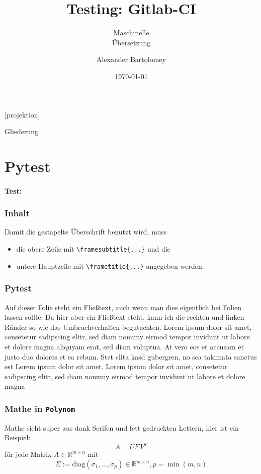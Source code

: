 \documentclass[t]{beamer}
\title{Testing: Gitlab-CI}
\subtitle{Maschinelle\\Übersetzung}
\date[Polynom]{\today}
\author{Alexander Bartolomey}
\institute[Polynom]{Polynom Aachen University}
\begin{document}
[projektion]{}

\begin{frame}[plain]
  \titlepage{}
\end{frame}

\begin{frame}{Gliederung}
  \tableofcontents[currentsubsubsection]
\end{frame}

\section{Pytest}

\begin{frame}
  \framesubtitle{Test:}
  \frametitle{Inhalt}
  Damit die gestapelte Überschrift benutzt wird, muss \begin{itemize}
    \item die obere Zeile mit \texttt{\textbackslash{}framesubtitle\{...\}} und die
    \item untere Hauptzeile mit \texttt{\textbackslash{}frametitle\{...\}} angegeben werden.
  \end{itemize} 
\end{frame}

\begin{frame}
  \frametitle{Pytest}
  Auf dieser Folie steht ein Fließtext, auch wenn man dies eigentlich
  bei Folien lassen sollte.  Da hier aber ein Fließtext steht, kann
  ich die rechten und linken Ränder so wie das Umbruchverhalten begutachten. 
  Lorem ipsum dolor sit amet, consetetur sadipscing elitr, sed diam nonumy eirmod 
  tempor invidunt ut labore et dolore magna aliquyam erat, sed diam voluptua. 
  At vero eos et accusam et justo duo dolores et ea rebum. Stet clita kasd gubergren, 
  no sea takimata sanctus est Lorem ipsum dolor sit amet. Lorem ipsum dolor sit amet, 
  consetetur sadipscing elitr, sed diam nonumy eirmod tempor invidunt ut labore 
  et dolore magna
\end{frame}

\begin{frame}
  \frametitle{Mathe in \texttt{Polynom}}
  Mathe sieht super aus dank Serifen und fett gedruckten Lettern, hier ist ein Beispiel:
  \[A = U\Sigma V^T\]
  für jede Matrix \(A \in \mathbb{R}^{m\times n}\) mit \[\Sigma:=\mathrm{diag}(\sigma_1,\dots,\sigma_p) \in \mathbb{R}^{m\times n}, p = \min(m,n)\]
\end{frame}
\end{document}
